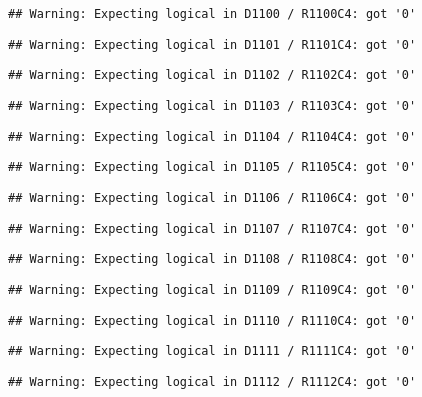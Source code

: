 \documentclass[
]{article}
\begin{document}
\begin{verbatim}
## Warning: Expecting logical in D1100 / R1100C4: got '0'
\end{verbatim}

\begin{verbatim}
## Warning: Expecting logical in D1101 / R1101C4: got '0'
\end{verbatim}

\begin{verbatim}
## Warning: Expecting logical in D1102 / R1102C4: got '0'
\end{verbatim}

\begin{verbatim}
## Warning: Expecting logical in D1103 / R1103C4: got '0'
\end{verbatim}

\begin{verbatim}
## Warning: Expecting logical in D1104 / R1104C4: got '0'
\end{verbatim}

\begin{verbatim}
## Warning: Expecting logical in D1105 / R1105C4: got '0'
\end{verbatim}

\begin{verbatim}
## Warning: Expecting logical in D1106 / R1106C4: got '0'
\end{verbatim}

\begin{verbatim}
## Warning: Expecting logical in D1107 / R1107C4: got '0'
\end{verbatim}

\begin{verbatim}
## Warning: Expecting logical in D1108 / R1108C4: got '0'
\end{verbatim}

\begin{verbatim}
## Warning: Expecting logical in D1109 / R1109C4: got '0'
\end{verbatim}

\begin{verbatim}
## Warning: Expecting logical in D1110 / R1110C4: got '0'
\end{verbatim}

\begin{verbatim}
## Warning: Expecting logical in D1111 / R1111C4: got '0'
\end{verbatim}

\begin{verbatim}
## Warning: Expecting logical in D1112 / R1112C4: got '0'
\end{verbatim}
\end{document}
